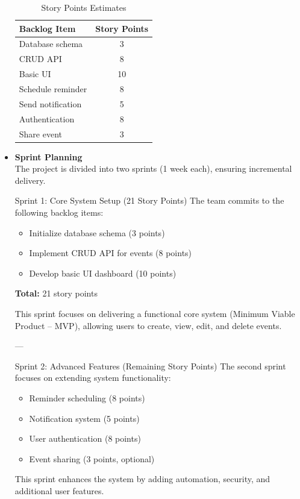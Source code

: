 \begin{itemize}
\begin{table}[H]
\centering
\caption{Story Points Estimates}
\begin{tabular}{|p{}|c|}
\hline
\textbf{Backlog Item} & \textbf{Story Points} \\
\hline
Database schema & 3 \\
\hline
CRUD API & 8 \\
\hline
Basic UI & 10 \\
\hline
Schedule reminder & 8 \\
\hline
Send notification & 5 \\
\hline
Authentication & 8 \\
\hline
Share event & 3 \\
\hline
\end{tabular}
\end{table}

\item \textbf{Sprint Planning}\\
The project is divided into two sprints (1 week each), ensuring incremental delivery.

Sprint 1: Core System Setup (21 Story Points)
The team commits to the following backlog items:
\begin{itemize}
  \item Initialize database schema (3 points)
  \item Implement CRUD API for events (8 points)
  \item Develop basic UI dashboard (10 points)
\end{itemize}

\noindent\textbf{Total:} 21 story points

This sprint focuses on delivering a functional core system (Minimum Viable Product -- MVP), allowing users to create, view, edit, and delete events.

---

Sprint 2: Advanced Features (Remaining Story Points)
The second sprint focuses on extending system functionality:
\begin{itemize}
  \item Reminder scheduling (8 points)
  \item Notification system (5 points)
  \item User authentication (8 points)
  \item Event sharing (3 points, optional)
\end{itemize}

This sprint enhances the system by adding automation, security, and additional user features.


\end{itemize}

